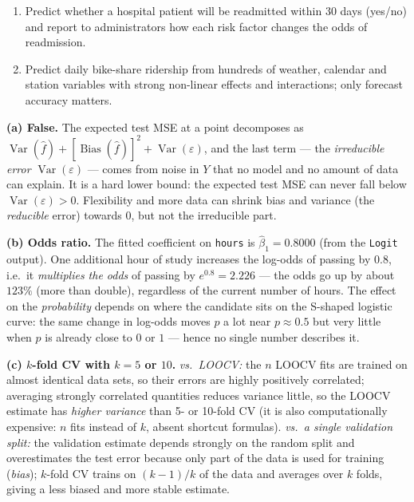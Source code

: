 \documentclass[11pt,a4paper]{article}
\begin{document}
\begin{enumerate}[label=(\alph*),leftmargin=7mm,itemsep=2.5mm]
\begin{enumerate}[label=(\roman*),nosep,topsep=1mm]
        for $n=250$ customers, and deliver a short interpretable list of the main drivers.
      \item Predict whether a hospital patient will be readmitted within 30 days (yes/no) and
        report to administrators how each risk factor changes the odds of readmission.
      \item Predict daily bike-share ridership from hundreds of weather, calendar and station
        variables with strong non-linear effects and interactions; only forecast accuracy
        matters.
    \end{enumerate}
\end{enumerate}

\ifdefined\withsolutions
\begin{solutionbox}
\textbf{(a) False.}
The expected test MSE at a point decomposes as
$\operatorname{Var}(\hat f)+[\operatorname{Bias}(\hat f)]^2+\operatorname{Var}(\varepsilon)$,
and the last term --- the \emph{irreducible error} $\operatorname{Var}(\varepsilon)$ --- comes
from noise in $Y$ that no model and no amount of data can explain. It is a hard lower bound:
the expected test MSE can never fall below $\operatorname{Var}(\varepsilon)>0$. Flexibility and
more data can shrink bias and variance (the \emph{reducible} error) towards $0$, but not the
irreducible part.

\medskip
\textbf{(b) Odds ratio.}
The fitted coefficient on \texttt{hours} is $\hat{\beta}_1=0.8000$ (from the \texttt{Logit}
output). One additional hour of study increases the log-odds of passing by $0.8$, i.e.\ it
\emph{multiplies the odds} of passing by $e^{0.8}=2.226$ --- the odds go up by about $123\%$
(more than double), regardless of the current number of hours.
The effect on the \emph{probability} depends on where the candidate sits on the S-shaped
logistic curve: the same change in log-odds moves $p$ a lot near $p\approx 0.5$ but very little
when $p$ is already close to $0$ or $1$ --- hence no single number describes it.

\medskip
\textbf{(c) $k$-fold CV with $k=5$ or $10$.}
\emph{vs.\ LOOCV:} the $n$ LOOCV fits are trained on almost identical data sets, so their
errors are highly positively correlated; averaging strongly correlated quantities reduces
variance little, so the LOOCV estimate has \emph{higher variance} than 5- or 10-fold CV
(it is also computationally expensive: $n$ fits instead of $k$, absent shortcut formulas).
\emph{vs.\ a single validation split:} the validation estimate depends strongly on the random
split and overestimates the test error because only part of the data is used for training
(\emph{bias}); $k$-fold CV trains on $(k-1)/k$ of the data and averages over $k$ folds, giving
a less biased and more stable estimate.


\end{solutionbox}
\end{document}
